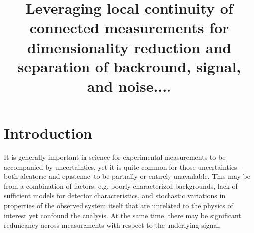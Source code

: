 \documentclass[12pt]{iopart}
\begin{document}
\title[]{Leveraging local continuity of connected measurements for dimensionality reduction and separation of backround, signal, and noise.... }

\author{}


%
%

%
%
%
% 
%



\section{Introduction}
It is generally important in science for experimental measurements to be accompanied by uncertainties, yet it is quite common for those uncertainties--both aleatoric and epistemic--to be partially or entirely unavailable. This may be from a combination of factors: e.g. poorly characterized backgrounds, lack of sufficient models for detector characteristics, and stochastic variations in properties of the observed system itself that are unrelated to the physics of interest yet confound the analysis. At the same time, there may be significant reduncancy across measurements with respect to the underlying signal.
\end{document}
